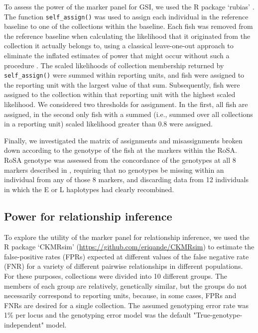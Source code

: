To assess the power of the marker panel for GSI, we used the R package
`rubias' \citep{moran2019bayesian}.  The function {\tt self\_assign()} was used
to assign each individual in the reference baseline to one of the
collections within the baseline.  Each fish was removed from the reference baseline
when calculating the likelihood that it originated from the collection it actually belongs
to, using a classical leave-one-out approach to eliminate the inflated estimates of
power that might occur without such a procedure \citep{anderson2008improved}.
The scaled likelihoods of collection membership returned by
{\tt self\_assign()} were summed within reporting units, and fish were
assigned to the reporting unit with the largest value of that sum.  Subsequently,
fish were assigned to the collection within that reporting unit with the highest
scaled likelihood.  We considered two thresholds for assignment.  In the first,
all fish are assigned, in the second only fish with a summed (i.e., summed
over all collections in a reporting unit)
scaled likelihood greater than 0.8 were assigned.

Finally, we investigated the matrix of assignments and misassignments
broken down according to the genotype of the fish at the markers within
the RoSA.  RoSA genotype \citep[EE, EL, or LL, see][]{thompson2020complex}
was assessed from the concordance of the genotypes
at all 8 markers described in \citet{thompson2020complex}, requiring that no genotypes be missing
within an individual from any of those 8 markers, and discarding data from 12 individuals
in which the E or L haplotypes had clearly recombined.



\subsection*{Power for relationship inference}

To explore the utility of the marker panel for relationship inference, we used
the R package `CKMRsim'
(\url{https://github.com/eriqande/CKMRsim})
to estimate the false-positive rates (FPRs) expected at
different values of the false negative rate (FNR) for a variety of different pairwise
relationships in different populations.  For these purposes, collections were divided into
10 different groups.  The members of each group are
relatively, genetically similar, but the groups do not necessarily correspond to reporting
units, because, in some cases, FPRs and FNRs are desired for a single
collection.   The assumed genotyping error rate
was 1\% per locus and the genotyping error model was the default
"True-genotype-independent" model.


